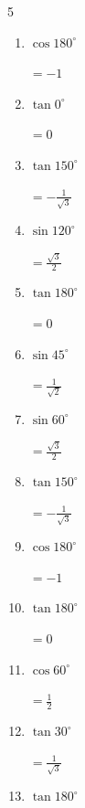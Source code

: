 \begin{multicols}{5}
\begin{enumerate}
  \item $\displaystyle \cos{180^\circ}$

        $\displaystyle =-1$

  \item $\displaystyle \tan{0^\circ}$

        $\displaystyle =0$

  \item $\displaystyle \tan{150^\circ}$

        $\displaystyle =-\frac{1}{\sqrt{3}}$

  \item $\displaystyle \sin{120^\circ}$

        $\displaystyle =\frac{\sqrt{3}}{2}$

  \item $\displaystyle \tan{180^\circ}$

        $\displaystyle =0$

  \item $\displaystyle \sin{45^\circ}$

        $\displaystyle =\frac{1}{\sqrt{2}}$

  \item $\displaystyle \sin{60^\circ}$

        $\displaystyle =\frac{\sqrt{3}}{2}$

  \item $\displaystyle \tan{150^\circ}$

        $\displaystyle =-\frac{1}{\sqrt{3}}$

\columnbreak %

\resetques

  \item $\displaystyle \cos{180^\circ}$

        $\displaystyle =-1$

  \item $\displaystyle \tan{180^\circ}$

        $\displaystyle =0$

  \item $\displaystyle \cos{60^\circ}$

        $\displaystyle =\frac{1}{2}$

  \item $\displaystyle \tan{30^\circ}$

        $\displaystyle =\frac{1}{\sqrt{3}}$

  \item $\displaystyle \tan{180^\circ}$


\end{enumerate}
\end{multicols}
